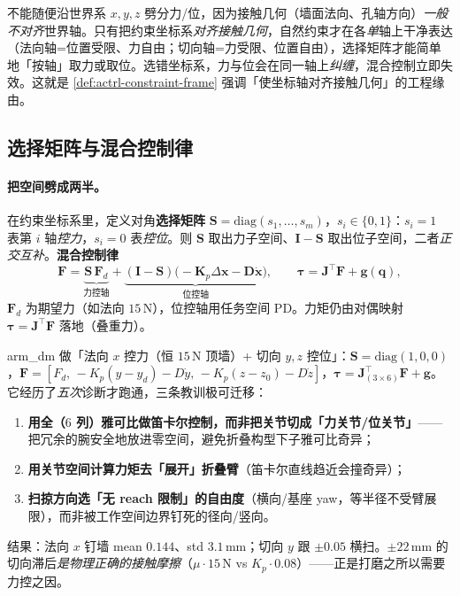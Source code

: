 \begin{insight}
不能随便沿世界系 $x,y,z$ 劈分力/位，因为接触几何（墙面法向、孔轴方向）\emph{一般不对齐}世界轴。只有把约束坐标系\emph{对齐接触几何}，自然约束才在各\emph{单}轴上干净表达（法向轴=位置受限、力自由；切向轴=力受限、位置自由），选择矩阵才能简单地「按轴」取力或取位。选错坐标系，力与位会在同一轴上\emph{纠缠}，混合控制立即失效。这就是 \cref{def:actrl-constraint-frame} 强调「使坐标轴对齐接触几何」的工程缘由。
\end{insight}

\subsection{选择矩阵与混合控制律}
\label{sec:actrl-selection}

\paragraph{把空间劈成两半。}
在约束坐标系里，定义对角\textbf{选择矩阵} $\mathbf{S}=\mathrm{diag}(s_1,\dots,s_m)$，$s_i\in\{0,1\}$：$s_i=1$ 表第 $i$ 轴\emph{控力}，$s_i=0$ 表\emph{控位}。则 $\mathbf{S}$ 取出力子空间、$\mathbf{I}-\mathbf{S}$ 取出位子空间，二者\emph{正交互补}。\textbf{混合控制律}
\begin{equation}
  \boxed{\mathbf{F}=\underbrace{\mathbf{S}\,\mathbf{F}_d}_{\text{力控轴}}+\underbrace{(\mathbf{I}-\mathbf{S})\big(-\mathbf{K}_p\Delta\mathbf{x}-\mathbf{D}\dot{\mathbf{x}}\big)}_{\text{位控轴}},\qquad \boldsymbol{\tau}=\mathbf{J}^\top\mathbf{F}+\mathbf{g}(\mathbf{q}),}
  \label{eq:actrl-hybrid}
\end{equation}
$\mathbf{F}_d$ 为期望力（如法向 $15\,\mathrm{N}$），位控轴用任务空间 PD。力矩仍由对偶映射 $\boldsymbol{\tau}=\mathbf{J}^\top\mathbf{F}$ 落地（叠重力）。

\begin{note}
arm\_dm 做「法向 $x$ 控力（恒 $15\,\mathrm{N}$ 顶墙）+ 切向 $y,z$ 控位」：$\mathbf{S}=\mathrm{diag}(1,0,0)$，$\mathbf{F}=[F_d,\,-K_p(y-y_d)-D\dot{y},\,-K_p(z-z_0)-D\dot{z}]$，$\boldsymbol{\tau}=\mathbf{J}^\top_{(3\times6)}\mathbf{F}+\mathbf{g}$。它经历了\emph{五次}诊断才跑通，三条教训极可迁移：
\begin{enumerate}
  \item \textbf{用全（$6$ 列）雅可比做笛卡尔控制，而非把关节切成「力关节/位关节」}——把冗余的腕安全地放进零空间，避免折叠构型下子雅可比奇异；
  \item \textbf{用关节空间计算力矩去「展开」折叠臂}（笛卡尔直线趋近会撞奇异）；
  \item \textbf{扫掠方向选「无 reach 限制」的自由度}（横向/基座 yaw，等半径不受臂展限），而非被工作空间边界钉死的径向/竖向。
\end{enumerate}
结果：法向 $x$ 钉墙 mean $0.144$、std $3.1\,\mathrm{mm}$；切向 $y$ 跟 $\pm0.05$ 横扫。$\pm22\,\mathrm{mm}$ 的切向滞后\emph{是物理正确的接触摩擦}（$\mu\!\cdot\!15\,\mathrm{N}$ vs $K_p\!\cdot\!0.08$）——正是打磨之所以需要力控之因。
\end{note}

